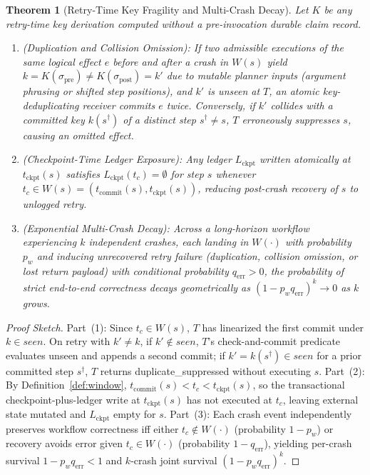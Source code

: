 \documentclass[10pt,journal]{IEEEtran}
\def\texttt#1{#1}%
\newtheorem{theorem}{Theorem}
\theoremstyle{definition}
\theoremstyle{remark}
\begin{document}
\begin{theorem}[Retry-Time Key Fragility and Multi-Crash Decay]\label{thm:fragility}
Let $K$ be any retry-time key derivation computed without a pre-invocation durable claim record.
\begin{enumerate}
  \item \emph{(Duplication and Collision Omission):} If two admissible executions of the same logical effect $e$ before and after a crash in $W(s)$ yield $k = K(\sigma_{\mathrm{pre}}) \neq K(\sigma_{\mathrm{post}}) = k'$ due to mutable planner inputs (argument phrasing or shifted step positions), and $k'$ is unseen at $T$, an atomic key-deduplicating receiver commits $e$ twice. Conversely, if $k'$ collides with a committed key $k(s^\dagger)$ of a distinct step $s^\dagger \neq s$, $T$ erroneously suppresses $s$, causing an omitted effect.
  \item \emph{(Checkpoint-Time Ledger Exposure):} Any ledger $L_{\mathrm{ckpt}}$ written atomically at $t_{\mathrm{ckpt}}(s)$ satisfies $L_{\mathrm{ckpt}}(t_c) = \emptyset$ for step $s$ whenever $t_c \in W(s) = (t_{\mathrm{commit}}(s), t_{\mathrm{ckpt}}(s))$, reducing post-crash recovery of $s$ to unlogged retry.
  \item \emph{(Exponential Multi-Crash Decay):} Across a long-horizon workflow experiencing $k$ independent crashes, each landing in $W(\cdot)$ with probability $p_w$ and inducing unrecovered retry failure (duplication, collision omission, or lost return payload) with conditional probability $q_{\mathrm{err}} > 0$, the probability of strict end-to-end correctness decays geometrically as $(1 - p_w q_{\mathrm{err}})^k \to 0$ as $k$ grows.
\end{enumerate}
\end{theorem}

\begin{proof}[Proof Sketch]
Part~(1): Since $t_c \in W(s)$, $T$ has linearized the first commit under $k \in \mathit{seen}$. On retry with $k' \neq k$, if $k' \notin \mathit{seen}$, $T$'s check-and-commit predicate evaluates unseen and appends a second commit; if $k' = k(s^\dagger) \in \mathit{seen}$ for a prior committed step $s^\dagger$, $T$ returns \texttt{duplicate\_suppressed} without executing $s$. Part~(2): By Definition~\ref{def:window}, $t_{\mathrm{commit}}(s) < t_c < t_{\mathrm{ckpt}}(s)$, so the transactional checkpoint-plus-ledger write at $t_{\mathrm{ckpt}}(s)$ has not executed at $t_c$, leaving external state mutated and $L_{\mathrm{ckpt}}$ empty for $s$. Part~(3): Each crash event independently preserves workflow correctness iff either $t_c \notin W(\cdot)$ (probability $1 - p_w$) or recovery avoids error given $t_c \in W(\cdot)$ (probability $1 - q_{\mathrm{err}}$), yielding per-crash survival $1 - p_w q_{\mathrm{err}} < 1$ and $k$-crash joint survival $(1 - p_w q_{\mathrm{err}})^k$.
\end{proof}
\end{document}
